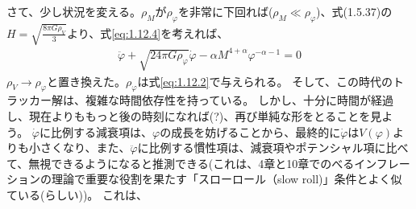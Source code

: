 \documentclass[11pt]{ltjsarticle}
\theoremstyle{plain}
\theoremstyle{break}
\begin{document}
さて、少し状況を変える。$\rho_M$が$\rho_\varphi$を非常に下回れば($\rho_M\ll \rho_{\varphi}$)、式(1.5.37)の$H=\sqrt{\frac{8\pi G \rho_V}{3}}$より、式\eqref{eq:1.12.4}を考えれば、
\begin{align}
  \ddot{\varphi}+\sqrt{24 \pi G \rho_{\varphi}} \dot{\varphi}-\alpha M^{4+\alpha} \varphi^{-\alpha-1}=0
\end{align}%
$\rho_V \to \rho_\varphi$と置き換えた。$\rho_\varphi$は式\eqref{eq:1.12.2}で与えられる。
そして、この時代のトラッカー解は、複雑な時間依存性を持っている。
しかし、十分に時間が経過し、現在よりももっと後の時刻になれば(?)、再び単純な形をとることを見よう。
$\dot{\varphi}$に比例する減衰項は、$\varphi$の成長を妨げることから、最終的に$\dot{\varphi}$は$V(\varphi)$よりも小さくなり、また、$\ddot{\varphi}$に比例する慣性項は、減衰項やポテンシャル項に比べて、無視できるようになると推測できる(これは、4章と10章でのべるインフレーションの理論で重要な役割を果たす「スローロール（slow roll)」条件とよく似ている(らしい))。
これは、
\end{document}
